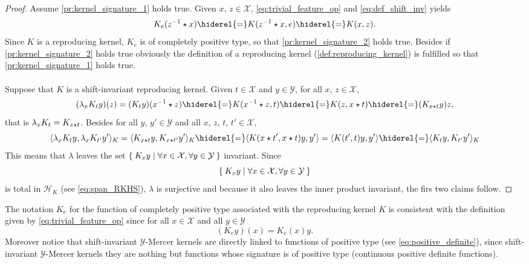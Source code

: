 \begin{proof}
    Assume \cref{pr:kernel_signature_1} holds true. Given $x$,
    $z\in\mathcal{X}$, \cref{eq:trivial_feature_op} and \cref{eq:def_shift_inv}
    yields
    \begin{dmath*}
        K_e(\inv{z}\groupop x)
        \hiderel{=}K(\inv{z} \groupop x,e)
        \hiderel{=}K(x,z).
    \end{dmath*}
    Since $K$ is a reproducing kernel, $K_e$ is of completely positive type, so
    that \cref{pr:kernel_signature_2} holds true. Besides if
    \cref{pr:kernel_signature_2} holds true obviously the definition of a
    reproducing kernel (\cref{def:reproducing_kernel}) is fulfilled so that
    \cref{pr:kernel_signature_1} holds true.
    \paragraph{}
    Suppose that $K$ is a shift-invariant reproducing kernel. Given
    $t\in\mathcal{X}$ and $y\in\mathcal{Y}$, for all $x$, $z\in\mathcal{X}$,
    \begin{dmath*}
        (\lambda_x K_t y)(z)=(K_t y)(\inv{x}\groupop z)
        \hiderel{=} K(\inv{x}\groupop z,t)
        \hiderel{=} K(z,x\groupop t)
        \hiderel{=} (K_{x\groupop t}y)z,
    \end{dmath*}
    that is $\lambda_xK_t=K_{x\star t}$. Besides for all $y$,
    $y'\in\mathcal{Y}$ and all $x$, $z$, $t$, $t'\in\mathcal{X}$,
    \begin{dmath*}
        \inner{\lambda_xK_ty, \lambda_xK_{t'}y'}_K=\inner{K_{x\groupop t}y,
        K_{x \groupop t'}y'}_K\hiderel{=}\inner{K(x \groupop t', x \groupop
        t)y,y'}=\inner{K(t',t)y, y'}\hiderel{=}\inner{K_ty, K_{t'}y'}_K
    \end{dmath*}
    This means that $\lambda$ leaves the set $\Set{K_xy|\forall
    x\in\mathcal{X}, \forall y\in\mathcal{Y}}$ invariant. Since
    \begin{dmath*}
        \Set{K_xy|\forall x\in\mathcal{X}, \forall y\in\mathcal{Y}}
    \end{dmath*}
    is total in $\mathcal{H}_K$ (see \cref{eq:span_RKHS}), $\lambda$ is
    surjective and because it also leaves the inner product invariant, the firs
    two claims follow.
\end{proof}
The notation $K_e$ for the function of completely positive type associated with
the reproducing kernel $K$ is consistent with the definition given by
\cref{eq:trivial_feature_op} since for all $x\in\mathcal{X}$ and all
$y\in\mathcal{Y}$
\begin{dmath*}
    (K_ey)(x)=K_e(x)y.
\end{dmath*}
Moreover notice that shift-invariant $\mathcal{Y}$-Mercer kernels are directly
linked to functions of positive type (see \cref{eq:positive_definite}), since
shift-invariant $\mathcal{Y}$-Mercer kernels they are nothing but functions
whose signature is of positive type (continuous positive definite functions).

